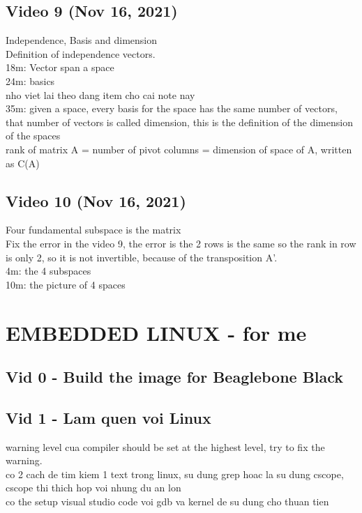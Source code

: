 \documentclass{article}
\begin{document}
\subsection{Video 9 (Nov 16, 2021)}
Independence, Basis and dimension
\\Definition of independence vectors.
\\18m: Vector span a space
\\24m: basics
\\nho viet lai theo dang item cho cai note nay
\\35m: given a space, every basis for the space has the same number of vectors, that number of vectors is called dimension, this is the definition of the dimension of the spaces
\\rank of matrix A = number of pivot columns = dimension of space of A, written as C(A)

\subsection{Video 10 (Nov 16, 2021)}
Four fundamental subspace is the matrix
\\Fix the error in the video 9, the error is the 2 rows is the same so the rank in row is only 2, so it is not invertible, because of the transposition A'.
\\4m: the 4 subspaces
\\10m: the picture of 4 spaces

\section{EMBEDDED LINUX - for me}


\subsection{Vid 0 - Build the image for Beaglebone Black}


\subsection{Vid 1 - Lam quen voi Linux}

warning level cua compiler should be set at the highest level, try to fix the warning.
\\co 2 cach de tim kiem 1 text trong linux, su dung grep hoac la su dung cscope, cscope thi thich hop voi nhung du an lon
\\co the setup visual studio code voi gdb va kernel de su dung cho thuan tien
\end{document}
